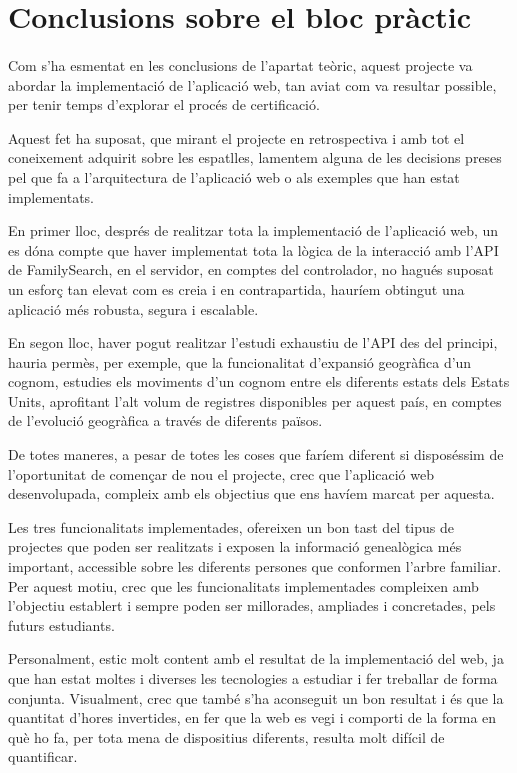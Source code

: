 \section{Conclusions sobre el bloc pràctic}

    \paragraph{}
    Com s’ha esmentat en les conclusions de l’apartat teòric, aquest projecte va abordar la implementació de l’aplicació web, tan aviat com va resultar possible, per tenir temps d'explorar el procés de certificació.

    Aquest fet ha suposat, que mirant el projecte en retrospectiva i amb tot el conei\-xe\-ment adquirit sobre les espatlles, lamentem alguna de les decisions preses pel que fa a l’arquitectura de l’aplicació web o als exemples que han estat implementats.

    En primer lloc, després de realitzar tota la implementació de l’aplicació web, un es dóna compte que haver implementat tota la lògica de la interacció amb l’API de FamilySearch, en el servidor, en comptes del controlador, no hagués suposat un esforç tan elevat com es creia i en contrapartida, hauríem obtingut una aplicació més robusta, segura i escalable.

    En segon lloc, haver pogut realitzar l’estudi exhaustiu de l’API des del principi, hauria permès, per exemple, que la funcionalitat d’expansió geogràfica d’un cognom, estudies els moviments d’un cognom entre els diferents estats dels Estats Units, aprofitant l’alt volum de registres disponibles per aquest país, en comptes de l’evolució geogràfica a través de diferents països.

    De totes maneres, a pesar de totes les coses que faríem diferent si disposéssim de l’oportunitat de començar de nou el projecte, crec que l’aplicació web desenvolupada, compleix amb els objectius que ens havíem marcat per aquesta.

    Les tres funcionalitats implementades, ofereixen un bon tast del tipus de projectes que poden ser realitzats i exposen la informació genealògica més important, accessible sobre les diferents persones que conformen l’arbre familiar. Per aquest motiu, crec que les funcionalitats implementades compleixen amb l’objectiu establert i sempre poden ser millorades, ampliades i concretades, pels futurs estudiants.

    Personalment, estic molt content amb el resultat de la implementació del web, ja que han estat moltes i diverses les tecnologies a estudiar i fer treballar de forma conjunta. Visualment, crec que també s’ha aconseguit un bon resultat i és que la quantitat d’hores invertides, en fer que la web es vegi i comporti de la forma en què ho fa, per tota mena de dispositius diferents, resulta molt difícil de quantificar.

